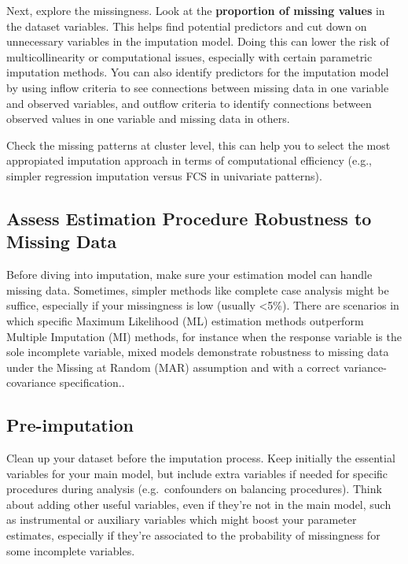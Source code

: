 \documentclass[
  article]{jss}
\begin{document}
Next, explore the missingness. Look at the
\textbf{proportion of missing values} in the dataset variables. This
helps find potential predictors and cut down on unnecessary variables in
the imputation model. Doing this can lower the risk of multicollinearity
or computational issues, especially with certain parametric imputation
methods. You can also identify predictors for the imputation model by
using inflow criteria to see connections between missing data in one
variable and observed variables, and outflow criteria to identify
connections between observed values in one variable and missing data in
others.

Check the missing patterns at cluster level, this can help you to select
the most appropiated imputation approach in terms of computational
efficiency (e.g., simpler regression imputation versus FCS in univariate
patterns).

\hypertarget{assess-estimation-procedure-robustness-to-missing-data}{%
\subsection{Assess Estimation Procedure Robustness to Missing
Data}\label{assess-estimation-procedure-robustness-to-missing-data}}

Before diving into imputation, make sure your estimation model can
handle missing data. Sometimes, simpler methods like complete case
analysis might be suffice, especially if your missingness is low
(usually \textless5\%). There are scenarios in which specific Maximum
Likelihood (ML) estimation methods outperform Multiple Imputation (MI)
methods, for instance when the response variable is the sole incomplete
variable, mixed models demonstrate robustness to missing data under the
Missing at Random (MAR) assumption and with a correct
variance-covariance specification.\cite{molenberghs2007}.

\hypertarget{pre-imputation}{%
\subsection{Pre-imputation}\label{pre-imputation}}

Clean up your dataset before the imputation process. Keep initially the
essential variables for your main model, but include extra variables if
needed for specific procedures during analysis (e.g.~confounders on
balancing procedures). Think about adding other useful variables, even
if they're not in the main model, such as instrumental or auxiliary
variables which might boost your parameter estimates, especially if
they're associated to the probability of missingness for some incomplete
variables.
\end{document}
